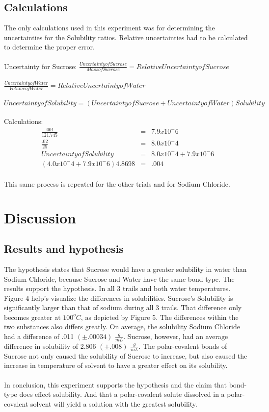 \documentclass{article}
\begin{document}
\subsection*{Calculations}
The only calculations used in this experiment was for determining the uncertainties for the Solubility ratios. Relative uncertainties had to be calculated to determine  the proper error. \\\\
Uncertainty for Sucrose:
$\frac{Uncertainty of Sucrose}{Mass of Sucrose} = Relative Uncertainty of Sucrose$ \\\\
$\frac{Uncertainty of Water}{Volume of Water} = Relative Uncertainty of Water$ \\\\
$Uncertainty of Solubility = (Uncertainty of Sucrose + Uncertainty of Water)Solubility$ \\\\
Calculations:
\begin{eqnarray}
\frac{.001}{121.745} &=& 7.9 x 10^-6 \\
\frac{.02}{25} &=& 8.0x10^-4 \\
Uncertainty of Solubility &=& 8.0x10^-4  +  7.9x10^-6 \\
(4.0 x10^-4+7.9 x 10^-6 )4.8698 &=& .004 \\
\end{eqnarray}

This same process is repeated for the other trials and for Sodium Chloride.


\section*{Discussion} 
\subsection*{Results and hypothesis}
The hypothesis states that Sucrose would have a greater solubility in water than Sodium Chloride, because Sucrose and Water have the same bond type. The results support the hypothesis. In all 3 trails and both water temperatures. Figure 4 help's visualize the differences in solubilities. Sucrose's Solubility is significantly larger than that of sodium during all 3 trails. That difference only becomes greater at $100^o C$, as depicted by Figure 5. The differences within the two substances also differs greatly. On average, the solubility Sodium Chloride had a difference of .011 $(\pm .00034)$ $\frac{g}{mL}$. Sucrose, however, had an average difference in solubility of 2.806 $(\pm .008)$ $\frac{g}{mL}$. The polar-covalent bonds of Sucrose not only caused the solubility of Sucrose to increase, but also caused the increase in temperature of solvent to have a greater effect on its solubility. \\\\
In conclusion, this experiment supports the hypothesis and the claim that bond-type does effect solubility. And that a polar-covalent solute dissolved in a polar-covalent solvent will yield a solution with the greatest solubility. \\
\end{document}
